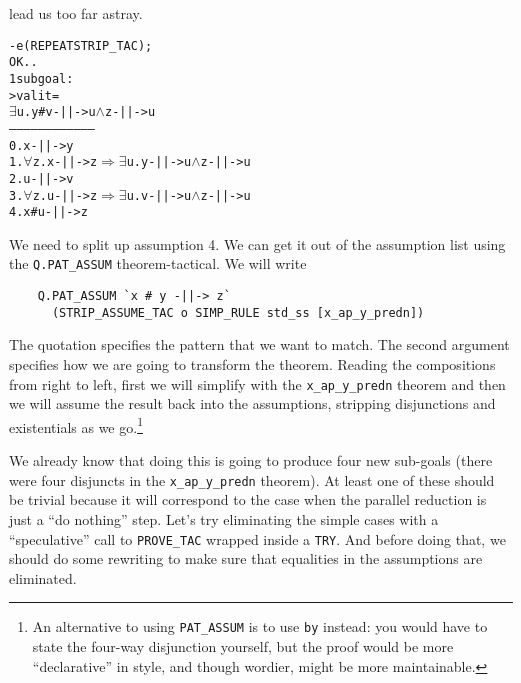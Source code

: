     lead us too far astray.
\begin{session}
\begin{alltt}
- e (REPEAT STRIP_TAC);
OK..
1 subgoal:
> val it =
    \(\exists\)u. y # v -||-> u \(\land\) z -||-> u
    ------------------------------------
      0.  x -||-> y
      1.  \(\forall\)z. x -||-> z \(\Rightarrow\) \(\exists\)u. y -||-> u \(\land\) z -||-> u
      2.  u -||-> v
      3.  \(\forall\)z. u -||-> z \(\Rightarrow\) \(\exists\)u. v -||-> u \(\land\) z -||-> u
      4.  x # u -||-> z
\end{alltt}
\end{session}
We need to split up assumption 4.  We can get it out of the assumption
list using the \texttt{Q.PAT\_ASSUM} theorem-tactical.  We will write
\begin{verbatim}
    Q.PAT_ASSUM `x # y -||-> z`
      (STRIP_ASSUME_TAC o SIMP_RULE std_ss [x_ap_y_predn])
\end{verbatim}
The quotation specifies the pattern that we want to match.  The second
argument specifies how we are going to transform the theorem.  Reading
the compositions from right to left, first we will simplify with the
\verb!x_ap_y_predn! theorem and then we will assume the result back
into the assumptions, stripping disjunctions and existentials as we
go.\footnote{An alternative to using \texttt{PAT\_ASSUM} is to use
  \texttt{by} instead: you would have to state the four-way
  disjunction yourself, but the proof would be more ``declarative'' in
  style, and though wordier, might be more maintainable.}

We already know that doing this is going to produce four new sub-goals
(there were four disjuncts in the \verb!x_ap_y_predn! theorem).  At
least one of these should be trivial because it will correspond to the
case when the parallel reduction is just a ``do nothing'' step.  Let's
try eliminating the simple cases with a ``speculative'' call to
\texttt{PROVE\_TAC} wrapped inside a \texttt{TRY}.  And before doing
that, we should do some rewriting to make sure that equalities in the
assumptions are eliminated.

